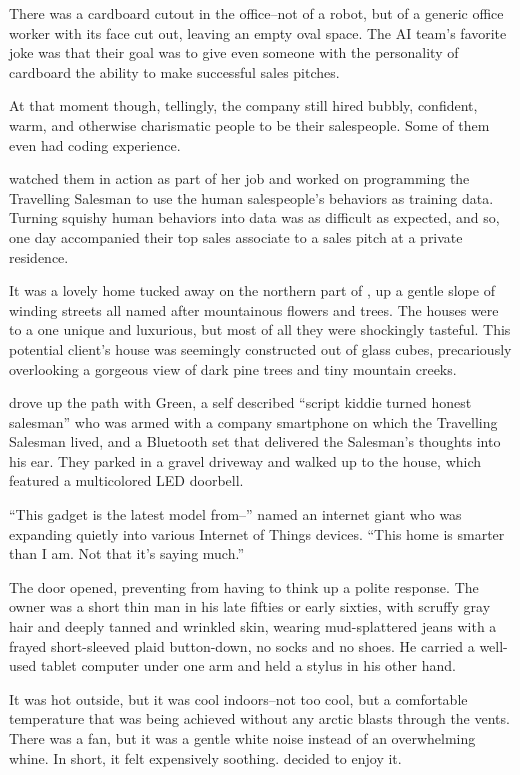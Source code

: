 There was a cardboard cutout in the office--not of a robot, but of a generic office worker with its face cut out, leaving an empty oval space. The AI team's favorite joke was that their goal was to give even someone with the personality of cardboard the ability to make successful sales pitches.

At that moment though, tellingly, the company still hired bubbly, confident, warm, and otherwise charismatic people to be their salespeople. Some of them even had coding experience.

{\protag} watched them in action as part of her job and worked on programming the Travelling Salesman to use the human salespeople’s behaviors as training data. Turning squishy human behaviors into data was as difficult as expected, and so, one day {\protag} accompanied their top sales associate to a sales pitch at a private residence.

It was a lovely home tucked away on the northern part of \crunchyCity{}, up a gentle slope of winding streets all named after mountainous flowers and trees. The houses were to a one unique and luxurious, but most of all they were shockingly tasteful. This potential client's house was seemingly constructed out of glass cubes, precariously overlooking a gorgeous view of dark pine trees and tiny mountain creeks.

{\protag} drove up the path with \energyJerk{} Green, a self described ``script kiddie turned honest salesman'' who was armed with a company smartphone on which the Travelling Salesman lived, and a Bluetooth set that delivered the Salesman's thoughts into his ear. They parked in a gravel driveway and walked up to the house, which featured a multicolored LED doorbell.

``This gadget is the latest model from--'' \energyJerk{} named an internet giant who was expanding quietly into various Internet of Things devices. ``This home is smarter than I am. Not that it's saying much.''

The door opened, preventing {\protag} from having to think up a polite response. The owner was a short thin man in his late fifties or early sixties, with scruffy gray hair and deeply tanned and wrinkled skin, wearing mud-splattered jeans with a frayed short-sleeved plaid button-down, no socks and no shoes. He carried a well-used tablet computer under one arm and held a stylus in his other hand.

It was hot outside, but it was cool indoors--not too cool, but a comfortable temperature that was being achieved without any arctic blasts through the vents. There was a fan, but it was a gentle white noise instead of an overwhelming whine. In short, it felt expensively soothing. {\protag} decided to enjoy it.

